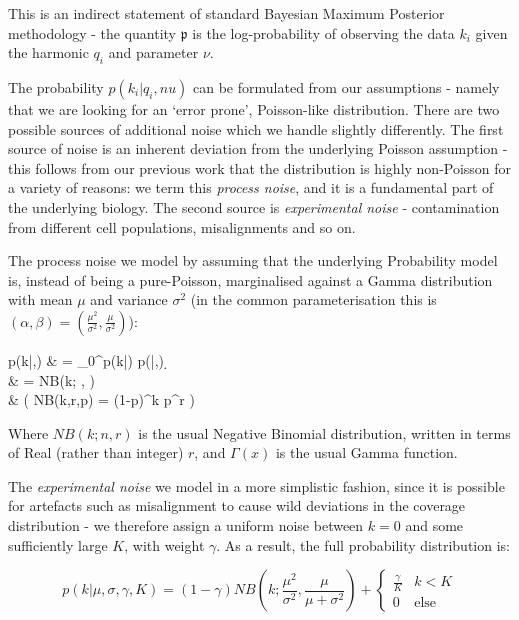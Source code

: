 \documentclass[fleqn,usenatbib]{mnras}
\begin{document}
				This is an indirect statement of standard Bayesian Maximum Posterior methodology - the quantity $\mathfrak{p}$ is the log-probability of observing the data $k_i$ given the harmonic $q_i$ and parameter $\nu$. 

				The probability $p(k_i | q_i,nu)$ can be formulated from our assumptions - namely that we are looking for an `error prone', Poisson-like distribution. There are two possible sources of additional noise which we handle slightly differently. The first source of noise is an inherent deviation from the underlying Poisson assumption - this follows from our previous work that the distribution is highly non-Poisson for a variety of reasons: we term this \textit{process noise}, and it is a fundamental part of the underlying biology. The second source is \textit{experimental noise} - contamination from different cell populations, misalignments and so on.

				The process noise we model by assuming that the underlying Probability model is, instead of being a pure-Poisson, marginalised against a Gamma distribution with mean $\mu$ and variance $\sigma^2$ (in the common parameterisation this is $(\alpha,\beta) = \left(\frac{\mu^2}{\sigma^2}, \frac{\mu}{\sigma^2}\right)$):
				\begin{spalign}
					p(k|\mu,\sigma) & = \int_0^\infty p(k|\lambda) p(\lambda|\mu,\sigma) \d \lambda 
					\\
					& = {NB}\left(k; ,  \right)
					\\
					& \left( NB(k,r,p) =  (1-p)^k p^r \right)
				\end{spalign}
				Where $NB(k;n,r)$ is the usual Negative Binomial distribution, written in terms of Real (rather than integer) $r$, and $\Gamma(x)$ is the usual Gamma function. 
				
				The \textit{experimental noise} we model in a more simplistic fashion, since it is possible for artefacts such as misalignment to cause wild deviations in the coverage distribution - we therefore assign a uniform noise between $k=0$ and some sufficiently large $K$, with weight $\gamma$. As a result, the full probability distribution is:

				\begin{equation}
					p(k|\mu,\sigma,\gamma,K) = (1- \gamma)  {NB}\left(k; \frac{\mu^2}{\sigma^2}, \frac{\mu}{\mu + \sigma^2} \right) + \begin{cases} \frac{\gamma}{K} & k < K \\ 0 &\text{else}\end{cases}\label{E:Probability}
				\end{equation}
				
\end{document}
